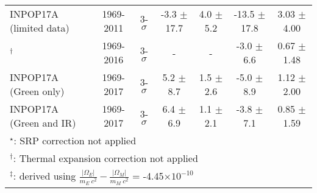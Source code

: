 \documentclass[fleqn,usenatbib,referee]{mnras}
\begin{document}
\begin{table*}
\begin{tabular}{lcccccc}
INPOP17A (limited data)	             &1969-2011 		       & 3-$\sigma$		                  & -3.3 $\pm$ 17.7 				                         & 4.0 $\pm$ 5.2 						& -13.5 $\pm$ 17.8                          & 3.03 $\pm$ 4.00                         \\
\cite{Hofmann2016}$^\dag$		&1969-2016 		       & 3-$\sigma$		                  & - 							                               & - 									& -3.0 $\pm$ 6.6                              & 0.67 $\pm$ 1.48                         \\
INPOP17A (Green only)	             &1969-2017 		       & 3-$\sigma$		                  & 5.2 $\pm$ 8.7 				                         & 1.5 $\pm$ 2.6 						& -5.0 $\pm$ 8.9                              & 1.12 $\pm$ 2.00                        \\
INPOP17A (Green and IR)            &1969-2017		       & 3-$\sigma$		                  & 6.4 $\pm$ 6.9 				                         & 1.1 $\pm$ 2.1 						& -3.8 $\pm$ 7.1                              & 0.85 $\pm$ 1.59                        \\ \bottomrule
\multicolumn{7}{l}{$^\star$: SRP correction not applied} \\
\multicolumn{7}{l}{$^\dag$: Thermal expansion correction not applied}\\
\multicolumn{7}{l}{$^\ddag$: derived using $\frac{|\Omega_E|}{m_E~c^2} - \frac{|\Omega_M|}{m_M~c^2}$ = -4.45$\times10^{-10}$ \protect\cite[Eqn. 6]{Williams2012}}

\end{tabular}
 \end{table*}

 

\clearpage

 

\label{lastpage}
\end{document}
